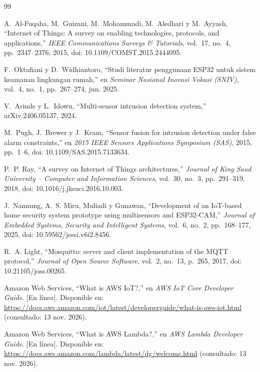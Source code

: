 \documentclass[manuscript,screen,nonacm]{acmart}
\begin{document}
\begin{thebibliography}{99}

A.~Al-Fuqaha, M.~Guizani, M.~Mohammadi, M.~Aledhari y M.~Ayyash, ``Internet of Things: A survey on enabling technologies, protocols, and applications,'' \emph{IEEE Communications Surveys \& Tutorials}, vol.~17, no.~4, pp.~2347--2376, 2015, doi: 10.1109/COMST.2015.2444095.

F.~Oktafiani y D.~Widhiantoro, ``Studi literatur penggunaan ESP32 untuk sistem keamanan lingkungan rumah,'' en \emph{Seminar Nasional Inovasi Vokasi (SNIV)}, vol.~4, no.~1, pp.~267--274, jun. 2025.

V.~Arinde y L.~Idowu, ``Multi-sensor intrusion detection system,'' arXiv:2406.05137, 2024.

M.~Pugh, J.~Brewer y J.~Kvam, ``Sensor fusion for intrusion detection under false alarm constraints,'' en \emph{2015 IEEE Sensors Applications Symposium (SAS)}, 2015, pp.~1--6, doi: 10.1109/SAS.2015.7133634.

P.~P. Ray, ``A survey on Internet of Things architectures,'' \emph{Journal of King Saud University -- Computer and Information Sciences}, vol.~30, no.~3, pp.~291--319, 2018, doi: 10.1016/j.jksuci.2016.10.003.

J.~Nannung, A.~S. Miru, Muliadi y Gunawan, ``Development of an IoT-based home security system prototype using multisensors and ESP32-CAM,'' \emph{Journal of Embedded Systems, Security and Intelligent Systems}, vol.~6, no.~2, pp.~168--177, 2025, doi: 10.59562/jessi.v6i2.8456.

R.~A. Light, ``Mosquitto: server and client implementation of the MQTT protocol,'' \emph{Journal of Open Source Software}, vol.~2, no.~13, p.~265, 2017, doi: 10.21105/joss.00265.

Amazon Web Services, ``What is AWS IoT?,'' en \emph{AWS IoT Core Developer Guide}. [En línea]. Disponible en: \url{https://docs.aws.amazon.com/iot/latest/developerguide/what-is-aws-iot.html} (consultado: 13 nov. 2026).

Amazon Web Services, ``What is AWS Lambda?,'' en \emph{AWS Lambda Developer Guide}. [En línea]. Disponible en: \url{https://docs.aws.amazon.com/lambda/latest/dg/welcome.html} (consultado: 13 nov. 2026).


\end{thebibliography}
\end{document}
